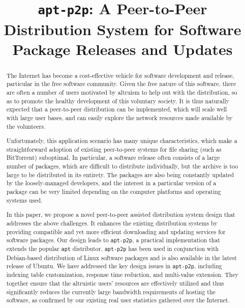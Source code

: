 \documentclass[conference]{IEEEtran}
\begin{document}
\title{\texttt{apt-p2p}: A Peer-to-Peer Distribution System for Software Package Releases and Updates}
\author{
\and
{}
}

\maketitle

\begin{abstract}
The Internet has become a cost-effective
vehicle for software development and release, particular in the free software community.
Given the free nature of this software, there are often a number of users
motivated by altruism to help out with the distribution, so as to promote the healthy development
of this voluntary society. It is thus naturally expected that a peer-to-peer distribution can be implemented,
which will scale well with large user bases, and can easily explore the network resources made available by
the volunteers.

Unfortunately, this application scenario has many unique characteristics, which
make a straightforward adoption of existing peer-to-peer systems for file sharing (such as BitTorrent) suboptimal. In particular,
a software release often consists of a large number of packages, which are difficult to distribute individually, but the archive is
too large to be distributed in its entirety. The packages are also being constantly
updated by the loosely-managed developers, and the interest in a particular version of a package can be very
limited depending on the computer platforms and operating systems used.

In this paper, we propose a novel peer-to-peer assisted distribution system design that
addresses the above challenges. It enhances the existing distribution systems by providing compatible and yet more efficient downloading and updating services
for software packages. Our design leads to \texttt{apt-p2p}, a practical implementation that extends the popular \texttt{apt} distributor.  \texttt{apt-p2p}  has been used in conjunction with Debian-based distribution of Linux
software packages and is also available in the latest release of Ubuntu. We have addressed the key design issues in \texttt{apt-p2p}, including indexing table customization,
response time reduction, and multi-value extension. They together ensure
that the altruistic users' resources are effectively utilized and thus significantly reduces the currently
large bandwidth requirements of hosting the software, as confirmed by our existing real user statistics gathered over the Internet.
\end{abstract}
\end{document}
